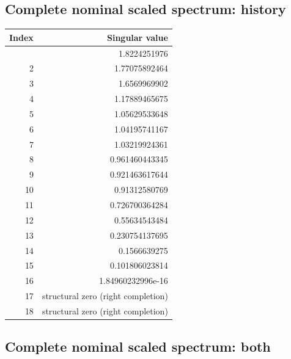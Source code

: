 \documentclass[aps,prd,preprint,onecolumn,notitlepage]{revtex4-2}
\begin{document}
\hypertarget{complete-nominal-scaled-spectrum-history}{%
\subsection{Complete nominal scaled spectrum: history}\label{complete-nominal-scaled-spectrum-history}}

\begin{longtable}[]{@{}rr@{}}
\toprule\noalign{}
Index & Singular value \\
\midrule\noalign{}
\endhead
\bottomrule\noalign{}
\endlastfoot
1 & 1.8224251976 \\
2 & 1.77075892464 \\
3 & 1.6569969902 \\
4 & 1.17889465675 \\
5 & 1.05629533648 \\
6 & 1.04195741167 \\
7 & 1.03219924361 \\
8 & 0.961460443345 \\
9 & 0.921463617644 \\
10 & 0.91312580769 \\
11 & 0.726700364284 \\
12 & 0.55634543484 \\
13 & 0.230754137695 \\
14 & 0.1566639275 \\
15 & 0.101806023814 \\
16 & 1.84960232996e-16 \\
17 & structural zero (right completion) \\
18 & structural zero (right completion) \\
\end{longtable}

\hypertarget{complete-nominal-scaled-spectrum-both}{%
\subsection{Complete nominal scaled spectrum: both}\label{complete-nominal-scaled-spectrum-both}}
\end{document}
